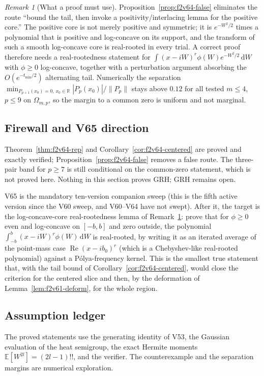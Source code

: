 \documentclass[11pt]{article}
\theoremstyle{definition}
\theoremstyle{remark}
\newtheorem{remark}[theorem]{Remark}
\newcommand{\dd}{\,\mathrm d}
\begin{document}
\begin{remark}[What a proof must use]
\label{rem:f2v64-structure}
Proposition~\ref{prop:f2v64-false} eliminates the route ``bound the tail,
then invoke a positivity/interlacing lemma for the positive core.''  The
positive core is not merely positive and symmetric; it is
\(e^{-W^2/2}\) times a polynomial that is positive and log-concave on its
support, and the transform of such a smooth log-concave core is
real-rooted in every trial.  A correct proof therefore needs a
real-rootedness statement for \(\int(x-iW)^r\phi(W)e^{-W^2/2}\dd W\) with
\(\phi\ge0\) log-concave, together with a perturbation argument absorbing
the \(O(e^{-t_{\min}/2})\) alternating tail.  Numerically the separation
\(\min_{P_{p+1}(x_0)=0,\,x_0\in\mathbb R}|P_p(x_0)|/\|P_p\|\) stays above
\(0.12\) for all tested \(m\le4\), \(p\le9\) on \(\Omega_{m,p}\), so the
margin to a common zero is uniform and not marginal.
\end{remark}

\subsection*{Firewall and V65 direction}
\label{fire:f2v64}
Theorem~\ref{thm:f2v64-rep} and Corollary~\ref{cor:f2v64-centered} are
proved and exactly verified; Proposition~\ref{prop:f2v64-false} removes a
false route.  The three-pair band for \(p\ge7\) is still conditional on
the common-zero statement, which is not proved here.  Nothing in this
section proves GRH; GRH remains open.

V65 is the mandatory ten-version companion sweep (this is the fifth
active version since the V60 sweep, and V60--V64 have not swept).  After
it, the target is the log-concave-core real-rootedness lemma of
Remark~\ref{rem:f2v64-structure}: prove that for \(\phi\ge0\) even and
log-concave on \([-b,b]\) and zero outside, the polynomial
\(\int_{-b}^b(x-iW)^r\phi(W)\dd W\) is real-rooted, by writing it as an
iterated average of the point-mass case
\(\operatorname{Re}(x-ib_0)^r\) (which is a Chebyshev-like real-rooted
polynomial) against a Pólya-frequency kernel.  This is the smallest true
statement that, with the tail bound of
Corollary~\ref{cor:f2v64-centered}, would close the criterion for the
centered slice and then, by the deformation of
Lemma~\ref{lem:f2v61-deform}, for the whole region.

\subsection*{Assumption ledger}
\label{ass:f2v64}
The proved statements use the generating identity of V53, the Gaussian
evaluation of the heat semigroup, the exact Hermite moments
\(\mathbb E[W^{2l}]=(2l-1)!!\), and the verifier.  The counterexample and
the separation margins are numerical exploration.
\endgroup
\end{document}
